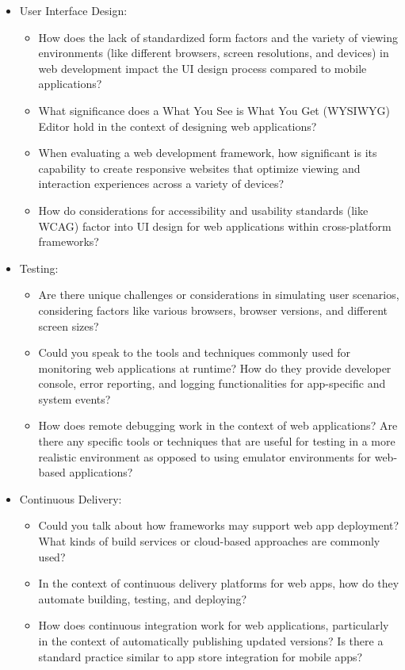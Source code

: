 \begin{itemize}
  \item User Interface Design:
    \begin{itemize}
      \item How does the lack of standardized form factors and the variety of viewing environments (like different browsers, screen resolutions, and devices) in web development impact the UI design process compared to mobile applications?
      \item What significance does a What You See is What You Get (WYSIWYG) Editor hold in the context of designing web applications?
      \item When evaluating a web development framework, how significant is its capability to create responsive websites that optimize viewing and interaction experiences across a variety of devices?
      \item How do considerations for accessibility and usability standards (like WCAG) factor into UI design for web applications within cross-platform frameworks?
    \end{itemize}
  \item Testing:
    \begin{itemize}
      \item Are there unique challenges or considerations in simulating user scenarios, considering factors like various browsers, browser versions, and different screen sizes?
      \item Could you speak to the tools and techniques commonly used for monitoring web applications at runtime? How do they provide developer console, error reporting, and logging functionalities for app-specific and system events?
      \item How does remote debugging work in the context of web applications? Are there any specific tools or techniques that are useful for testing in a more realistic environment as opposed to using emulator environments for web-based applications?
    \end{itemize}
  \item Continuous Delivery:
    \begin{itemize}
      \item Could you talk about how frameworks may support web app deployment? What kinds of build services or cloud-based approaches are commonly used?
      \item In the context of continuous delivery platforms for web apps, how do they automate building, testing, and deploying?
      \item How does continuous integration work for web applications, particularly in the context of automatically publishing updated versions? Is there a standard practice similar to app store integration for mobile apps?

\end{itemize}
\end{itemize}
